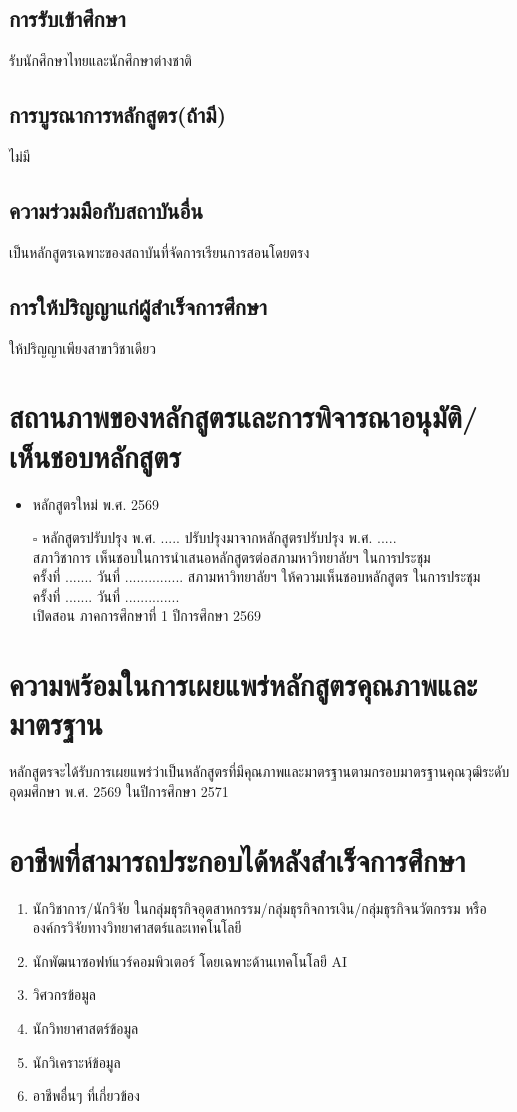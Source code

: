 \subsection{การรับเข้าศึกษา}
รับนักศึกษาไทยและนักศึกษาต่างชาติ

\subsection{การบูรณาการหลักสูตร(ถ้ามี)}
ไม่มี

\subsection{ความร่วมมือกับสถาบันอื่น}
เป็นหลักสูตรเฉพาะของสถาบันที่จัดการเรียนการสอนโดยตรง

\subsection{การให้ปริญญาแก่ผู้สำเร็จการศึกษา}
ให้ปริญญาเพียงสาขาวิชาเดียว

\section{สถานภาพของหลักสูตรและการพิจารณาอนุมัติ/เห็นชอบหลักสูตร}
\begin{itemize}
	\item หลักสูตรใหม่ พ.ศ. 2569
	\item[$\square$] หลักสูตรปรับปรุง พ.ศ. .....  ปรับปรุงมาจากหลักสูตรปรับปรุง พ.ศ. .....\\
	สภาวิชาการ เห็นชอบในการนำเสนอหลักสูตรต่อสภามหาวิทยาลัยฯ ในการประชุม \\ ครั้งที่ ....... วันที่ ...............
	สภามหาวิทยาลัยฯ ให้ความเห็นชอบหลักสูตร ในการประชุม \\ ครั้งที่ ....... วันที่ .............. \\
	เปิดสอน ภาคการศึกษาที่ 1 ปีการศึกษา 2569
\end{itemize}
\section{ความพร้อมในการเผยแพร่หลักสูตรคุณภาพและมาตรฐาน}
	หลักสูตรจะได้รับการเผยแพร่ว่าเป็นหลักสูตรที่มีคุณภาพและมาตรฐานตามกรอบมาตรฐานคุณวุฒิระดับอุดมศึกษา พ.ศ. 2569 ในปีการศึกษา 2571
\section{อาชีพที่สามารถประกอบได้หลังสำเร็จการศึกษา}
\begin{enumerate}
	\item นักวิชาการ/นักวิจัย ในกลุ่มธุรกิจอุตสาหกรรม/กลุ่มธุรกิจการเงิน/กลุ่มธุรกิจนวัตกรรม หรือองค์กรวิจัยทางวิทยาศาสตร์และเทคโนโลยี
	\item นักพัฒนาซอฟท์แวร์คอมพิวเตอร์ โดยเฉพาะด้านเทคโนโลยี AI
	\item วิศวกรข้อมูล 
	\item นักวิทยาศาสตร์ข้อมูล
	\item นักวิเคราะห์ข้อมูล 
	\item อาชีพอื่นๆ ที่เกี่ยวข้อง
\end{enumerate}

